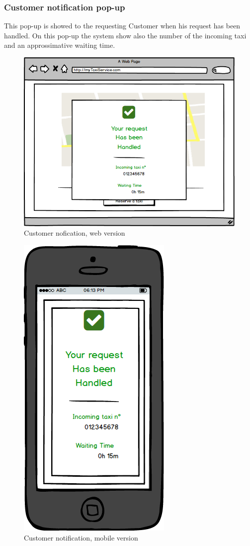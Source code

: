 \documentclass{report}
\begin{document}
			
			\subsubsection{Customer notification pop-up}
			This pop-up is showed to the requesting Customer when his request has been handled. On this pop-up the system show also the number of the incoming taxi and an approssimative 				waiting time.
			\begin{figure}[H]
			\centering
			\includegraphics[scale=0.5]{IMG/UserInterfaces/customerNotification.png}
			\caption{Customer nofication, web version}\label{visina8}
			\end{figure}
			\begin{figure}[H]
			\centering
			\includegraphics[scale=0.4]{IMG/UserInterfaces/customerNotification_m.png}
			\caption{Customer notification, mobile version}\label{visina8}
			\end{figure}
			
\end{document}
